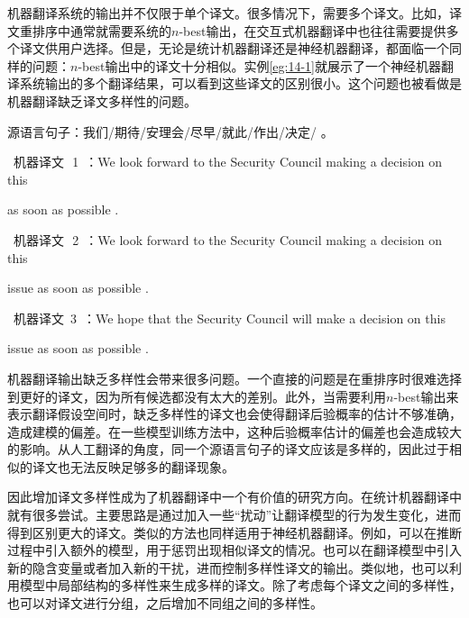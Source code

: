 \parinterval 机器翻译系统的输出并不仅限于单个译文。很多情况下，需要多个译文。比如，译文重排序中通常就需要系统的$n$-best输出，在交互式机器翻译中也往往需要提供多个译文供用户选择。但是，无论是统计机器翻译还是神经机器翻译，都面临一个同样的问题：$n$-best输出中的译文十分相似。实例\ref{eg:14-1}就展示了一个神经机器翻译系统输出的多个翻译结果，可以看到这些译文的区别很小。这个问题也被看做是机器翻译缺乏译文多样性的问题。

\begin{example}
源语言句子：我们/期待/安理会/尽早/就此/作出/决定/ 。

\qquad\ 机器译文\ \,1\ ：We look forward to the Security Council making a decision on this

\hspace{8.3em}as soon as possible .

\qquad\ 机器译文\ \,2\ ：We look forward to the Security Council making a decision on this

\hspace{8.3em}issue as soon as possible .

\qquad\ 机器译文\ 3\ ：We hope that the Security Council will make a decision on this

\hspace{8.4em}issue as soon as possible .

\label{eg:14-1}
\end{example}

\parinterval  机器翻译输出缺乏多样性会带来很多问题。一个直接的问题是在重排序时很难选择到更好的译文，因为所有候选都没有太大的差别。此外，当需要利用$n$-best输出来表示翻译假设空间时，缺乏多样性的译文也会使得翻译后验概率的估计不够准确，造成建模的偏差。在一些模型训练方法中，这种后验概率估计的偏差也会造成较大的影响。从人工翻译的角度，同一个源语言句子的译文应该是多样的，因此过于相似的译文也无法反映足够多的翻译现象。

\parinterval 因此增加译文多样性成为了机器翻译中一个有价值的研究方向。在统计机器翻译中就有很多尝试。主要思路是通过加入一些“扰动”让翻译模型的行为发生变化，进而得到区别更大的译文。类似的方法也同样适用于神经机器翻译。例如，可以在推断过程中引入额外的模型，用于惩罚出现相似译文的情况。也可以在翻译模型中引入新的隐含变量或者加入新的干扰，进而控制多样性译文的输出。类似地，也可以利用模型中局部结构的多样性来生成多样的译文。除了考虑每个译文之间的多样性，也可以对译文进行分组，之后增加不同组之间的多样性。

